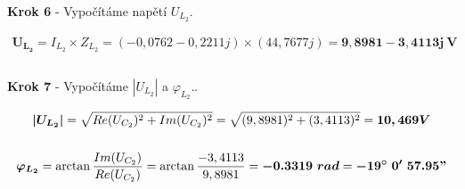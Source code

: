 \begin{center}
\textbf{Krok 6} - Vypočítáme napětí $U_{L_2}$. \\
\end{center}
\vspace{-0.5cm}

\begin{gather*}
\boldsymbol{U_{L_2}} = I_{L_2} \times Z_{L_2} = (-0,0762 - 0,2211j) \times (44,7677j) = \boldsymbol{9,8981 - 3,4113j\ V}\\\\
\end{gather*}

\begin{center}
\textbf{Krok 7} - Vypočítáme $|U_{L_2}|$ a $\varphi_{L_2}$.. \\
\end{center}
\vspace{-0.5cm}

\begin{gather*}
\boldsymbol{|U_{L_2}|} = \sqrt{Re(U_{C_2})^2 + Im(U_{C_2})^2} = \sqrt{(9,8981)^2 + (3,4113)^2} = \boldsymbol{10,469 V} \\\\
\newline
\newline
\boldsymbol{\varphi_{L_2}} = \arctan\frac{Im(U_{C_2})}{Re(U_{C_2})} = \arctan\frac{-3,4113}{9,8981} = \boldsymbol{-0.3319
\ rad} = \boldsymbol{-19^{\circ}\ 0'\ 57.95"}
\end{gather*}

